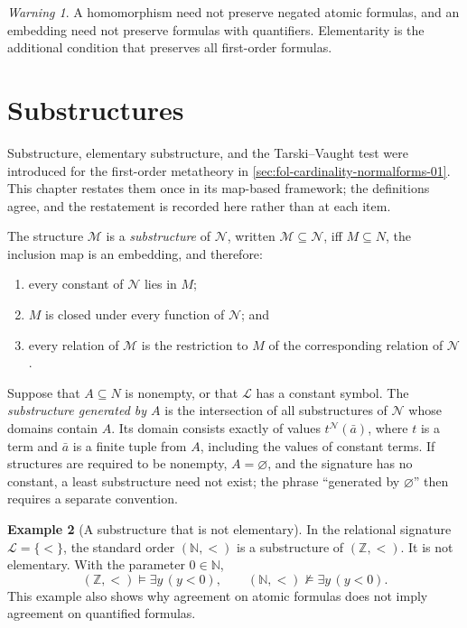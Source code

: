 \documentclass[11pt,oneside,openany]{book}
\theoremstyle{definition}
\newtheorem{definition}{Definition}[chapter]
\newtheorem{example}[definition]{Example}
\theoremstyle{plain}
\theoremstyle{remark}
\newtheorem{warning}[definition]{Warning}
\let\LogicDefinition\definition
\let\endLogicDefinition\enddefinition
\renewenvironment{definition}[1][]{%
  \LogicDefinition[#1]%
  \if\relax\detokenize{#1}\relax\else\index{#1}\fi
}{\endLogicDefinition}
\newcommand{\N}{\mathbb{N}}
\newcommand{\Z}{\mathbb{Z}}
\newcommand{\Lang}{\mathcal{L}}
\newcommand{\entails}{\models}
\newcommand{\notentails}{\not\models}
\begin{document}
\begin{warning}
A homomorphism need not preserve negated atomic formulas, and an embedding need
not preserve formulas with quantifiers.  Elementarity is the additional
condition that preserves all first-order formulas.
\end{warning}

\section{Substructures}
\label{sec:maps-elementarity-02}

Substructure, elementary substructure, and the Tarski--Vaught test were
introduced for the first-order metatheory in
\cref{sec:fol-cardinality-normalforms-01}.  This chapter restates them once
in its map-based framework; the definitions agree, and the restatement is
recorded here rather than at each item.

\begin{definition}[Substructure]
The structure \(\mathcal M\) is a \emph{substructure} of \(\mathcal N\),
written \(\mathcal M\subseteq\mathcal N\), iff \(M\subseteq N\), the
inclusion map is an embedding, and therefore:
\begin{enumerate}
  \item every constant of \(\mathcal N\) lies in \(M\);
  \item \(M\) is closed under every function of \(\mathcal N\); and
  \item every relation of \(\mathcal M\) is the restriction to \(M\) of the
        corresponding relation of \(\mathcal N\).
\end{enumerate}
\end{definition}

Suppose that \(A\subseteq N\) is nonempty, or that \(\Lang\) has a constant
symbol.  The \emph{substructure generated by \(A\)} is the intersection of all
substructures of \(\mathcal N\) whose domains contain \(A\).  Its domain
consists exactly of values \(t^{\mathcal N}(\bar a)\), where \(t\) is a term
and \(\bar a\) is a finite tuple from \(A\), including the values of constant
terms.  If structures are required to be nonempty, \(A=\varnothing\), and the
signature has no constant, a least substructure need not exist; the phrase
``generated by \(\varnothing\)'' then requires a separate convention.

\begin{example}[A substructure that is not elementary]
In the relational signature \(\Lang=\{<\}\), the standard order
\((\N,<)\) is a substructure of \((\Z,<)\).  It is not elementary.  With the
parameter \(0\in\N\),
\[
  (\Z,<)\entails\exists y\,(y<0),
  \qquad
  (\N,<)\notentails\exists y\,(y<0).
\]
This example also shows why agreement on atomic formulas does not imply
agreement on quantified formulas.
\end{example}
\end{document}
